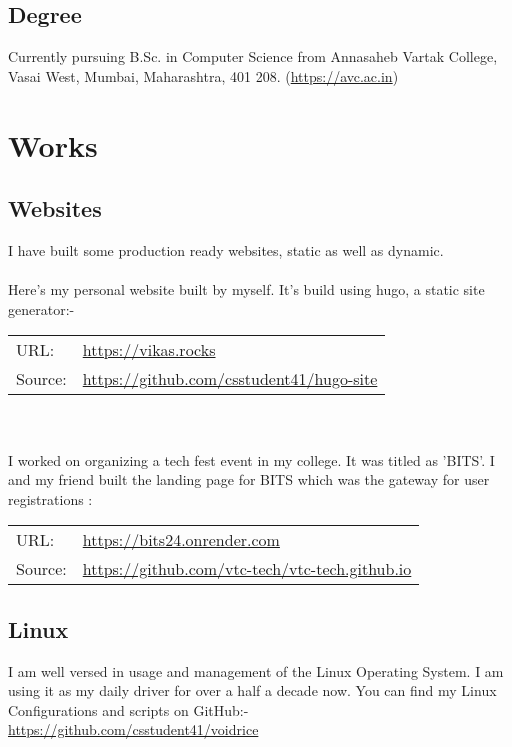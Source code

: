 \documentclass[14pt]{extarticle}
\newcommand\tab[1][1cm]{\hspace*{#1}}
\begin{document}
\subsection{Degree}
Currently pursuing B.Sc. in Computer Science from
Annasaheb Vartak College, Vasai West, Mumbai, Maharashtra, 401 208.
(\url{https://avc.ac.in})


\section{Works}

\subsection{Websites}
I have built some production ready websites, static as well as dynamic.\\
\\
Here's my personal website built by myself.
It's build using hugo, a static site generator:-\\
\begin{tabular}{l l}
	URL: & \url{https://vikas.rocks} \\
	Source: & \url{https://github.com/csstudent41/hugo-site} \\
\end{tabular}
\\
\\
I worked on organizing a tech fest event in my college.
It was titled as 'BITS'.
I and my friend built the landing page for BITS which was the gateway for user registrations :\\
\begin{tabular}{l l}
	URL: & \url{https://bits24.onrender.com}\\
	Source: & \url{https://github.com/vtc-tech/vtc-tech.github.io}\\
\end{tabular}

\subsection{Linux}
I am well versed in usage and management of the Linux Operating System.
I am using it as my daily driver for over a half a decade now.
You can find my Linux Configurations and scripts on GitHub:-\\
\tab \url{https://github.com/csstudent41/voidrice}
\end{document}
